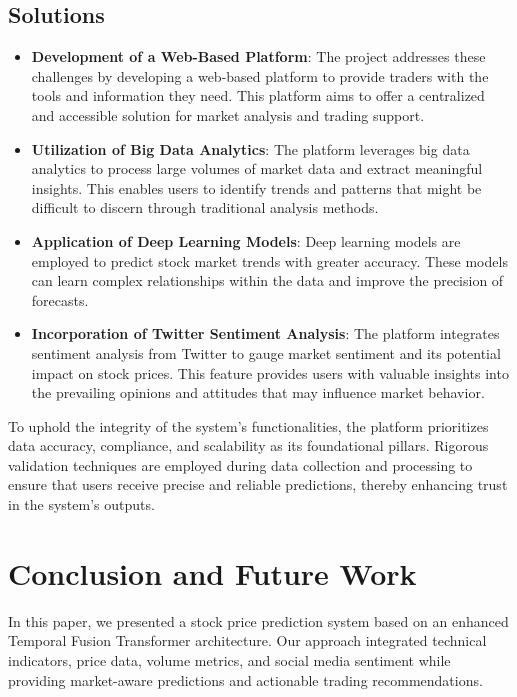 \documentclass[conference]{IEEEtran}
\begin{document}
\subsection{Solutions}

\begin{itemize}
\item \textbf{Development of a Web-Based Platform}: The project addresses these challenges by developing a web-based platform to provide traders with the tools and information they need. This platform aims to offer a centralized and accessible solution for market analysis and trading support.
\item \textbf{Utilization of Big Data Analytics}: The platform leverages big data analytics to process large volumes of market data and extract meaningful insights. This enables users to identify trends and patterns that might be difficult to discern through traditional analysis methods.
\item \textbf{Application of Deep Learning Models}: Deep learning models are employed to predict stock market trends with greater accuracy. These models can learn complex relationships within the data and improve the precision of forecasts.
\item \textbf{Incorporation of Twitter Sentiment Analysis}: The platform integrates sentiment analysis from Twitter to gauge market sentiment and its potential impact on stock prices. This feature provides users with valuable insights into the prevailing opinions and attitudes that may influence market behavior.
\end{itemize}

To uphold the integrity of the system's functionalities, the platform prioritizes data accuracy, compliance, and scalability as its foundational pillars. Rigorous validation techniques are employed during data collection and processing to ensure that users receive precise and reliable predictions, thereby enhancing trust in the system's outputs.

\section{Conclusion and Future Work}

In this paper, we presented a stock price prediction system based on an enhanced Temporal Fusion Transformer architecture. Our approach integrated technical indicators, price data, volume metrics, and social media sentiment while providing market-aware predictions and actionable trading recommendations.
\end{document}

